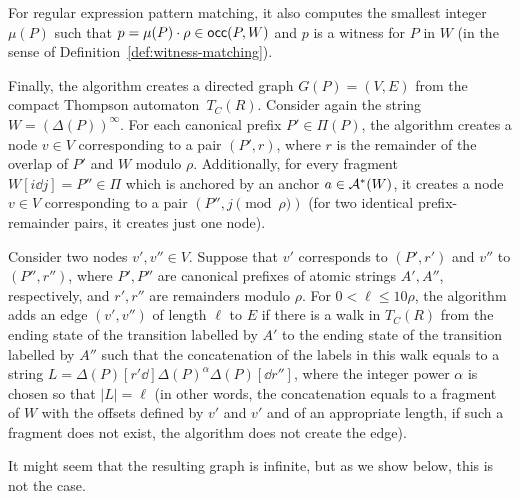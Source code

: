 For regular expression pattern matching, it also computes the smallest integer $\mu(P)$ such that $p = \mu(P) \cdot \rho \in \mathsf{occ}(P, W)$ and $p$ is a witness for $P$ in $W$ (in the sense of Definition~\ref{def:witness-matching}). 

Finally, the algorithm creates a directed graph $G(P) = (V,E)$ from the compact Thompson automaton~$T_C(R)$. Consider again the string $W = (\Delta(P))^\infty$. For each canonical prefix $P' \in \Pi(P)$, the algorithm creates a node $v \in V$ corresponding to a pair $(P', r)$, where $r$ is the remainder of  the overlap of $P'$ and $W$ modulo $\rho$. Additionally, for every fragment $W[i \dd j] = P'' \in \Pi$ which is anchored by an anchor $a \in \mathcal{A}^\ast(W)$, it creates a node $v \in V$ corresponding to a pair $(P'', j \pmod{\rho})$ (for two identical prefix-remainder pairs, it creates just one node). 

Consider two nodes $v',v'' \in V$. Suppose that $v'$ corresponds to $(P',r')$ and $v''$ to $(P'',r'')$, where $P',P''$ are canonical prefixes of atomic strings $A',A''$, respectively, and $r',r''$ are remainders modulo $\rho$. For $0 < \ell \le 10 \rho$, the algorithm adds an edge $(v',v'')$ of length $\ell$ to $E$ if there is a walk in $T_C(R)$ from the ending state of the transition labelled by $A'$ to the ending state   of the transition labelled by $A''$ such that the concatenation of the labels in this walk equals to a string $L = \Delta(P)[r' \dd] \Delta(P)^\alpha \Delta(P)[\dd r'']$, where the integer power $\alpha$ is chosen so that $|L| = \ell$ (in other words, the concatenation equals to a fragment of $W$ with the offsets defined by $v'$ and $v'$ and of an appropriate length, if such a fragment does not exist, the algorithm does not create the edge). 

It might seem that the resulting graph is infinite, but as we show below, this is not the case.

